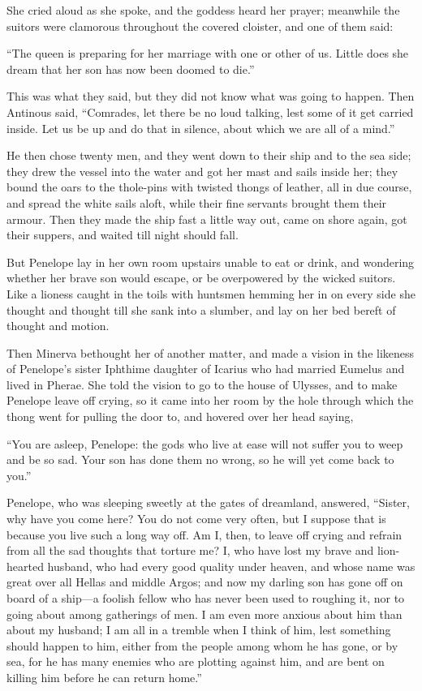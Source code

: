 She cried aloud as she spoke, and the goddess heard her prayer; meanwhile the
suitors were clamorous throughout the covered cloister, and one of them said:

“The queen is preparing for her marriage with one or other of us. Little does
she dream that her son has now been doomed to die.”

This was what they said, but they did not know what was going to happen. Then
Antinous said, “Comrades, let there be no loud talking, lest some of it get
carried inside. Let us be up and do that in silence, about which we are all of
a mind.”

He then chose twenty men, and they went down to their ship and to the sea side;
they drew the vessel into the water and got her mast and sails inside her; they
bound the oars to the thole-pins with twisted thongs of leather, all in due
course, and spread the white sails aloft, while their fine servants brought
them their armour. Then they made the ship fast a little way out, came on shore
again, got their suppers, and waited till night should fall.

But Penelope lay in her own room upstairs unable to eat or drink, and wondering
whether her brave son would escape, or be overpowered by the wicked suitors.
Like a lioness caught in the toils with huntsmen hemming her in on every side
she thought and thought till she sank into a slumber, and lay on her bed bereft
of thought and motion.

Then Minerva bethought her of another matter, and made a vision in the likeness
of Penelope’s sister Iphthime daughter of Icarius who had married Eumelus and
lived in Pherae. She told the vision to go to the house of Ulysses, and to make
Penelope leave off crying, so it came into her room by the hole through which
the thong went for pulling the door to, and hovered over her head saying,

“You are asleep, Penelope: the gods who live at ease will not suffer you to
weep and be so sad. Your son has done them no wrong, so he will yet come back
to you.”

Penelope, who was sleeping sweetly at the gates of dreamland, answered,
“Sister, why have you come here? You do not come very often, but I suppose that
is because you live such a long way off. Am I, then, to leave off crying and
refrain from all the sad thoughts that torture me? I, who have lost my brave
and lion-hearted husband, who had every good quality under heaven, and whose
name was great over all Hellas and middle Argos; and now my darling son has
gone off on board of a ship—a foolish fellow who has never been used to
roughing it, nor to going about among gatherings of men. I am even more anxious
about him than about my husband; I am all in a tremble when I think of him,
lest something should happen to him, either from the people among whom he has
gone, or by sea, for he has many enemies who are plotting against him, and are
bent on killing him before he can return home.”

